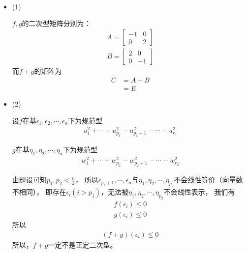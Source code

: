 \documentclass{article}
\begin{document}
\begin{itemize}
  \item (1)

        $f, g$的二次型矩阵分别为：
        \begin{align*}
          A = \begin{bmatrix}
                -1 & 0 \\
                0  & 2
              \end{bmatrix} \\
          B = \begin{bmatrix}
                2 & 0  \\
                0 & -1
              \end{bmatrix}
        \end{align*}
        而$f + g$的矩阵为
        \begin{align*}
          C & = A + B \\
            & = E
        \end{align*}

  \item (2)

        设$f$在基$\epsilon_1, \epsilon_2, \cdots, \epsilon_n$下为规范型
        \begin{align*}
          u_1^2 + \cdots + u_{p_{1}}^2 - u_{p_{1} + 1}^2 - \cdots - u_{r_1}^2
        \end{align*}

        $g$在基$\eta_1, \eta_2, \cdots, \eta_n$下为规范型
        \begin{align*}
          w_1^2 + \cdots + w_{p_{2}}^2 - w_{p_{2} + 1}^2 - \cdots - w_{r_2}^2
        \end{align*}

        由题设可知$p_1, p_2 < \frac{n}{2}$，
        所以$\epsilon_{p_1 + 1}, \cdots, \epsilon_n$与$\eta_1, \eta_2, \cdots, \eta_{p_2}$不会线性等价（向量数不相同），
        即存在$\epsilon_i (i > p_1)$，无法被$\eta_1, \eta_2, \cdots, \eta_{p_2}$不会线性表示，
        我们有
        \begin{align}
          f(\epsilon_i) \leq 0 \\
          g(\epsilon_i) \leq 0
        \end{align}
        所以
        \begin{align}
          (f + g)(\epsilon_i) \leq 0
        \end{align}
        所以，$f + g$一定不是正定二次型。
\end{itemize}
\end{document}
